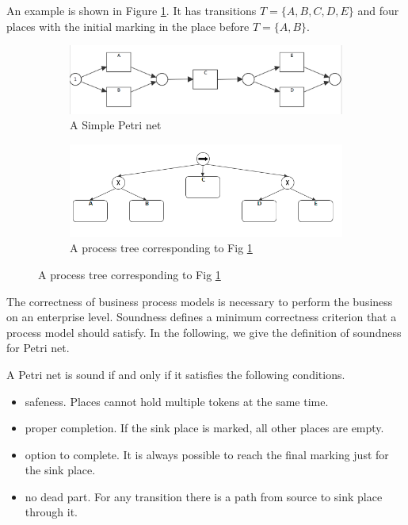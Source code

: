 An example is shown in Figure \ref{fig:pn-seq-2}. It has transitions $T=\{A,B,C,D,E\}$ and four places with the initial marking in the place before $T=\{A,B\}$. 
\begin{figure}[!h]
	\centering
	\begin{subfigure}[b]{0.45\textwidth}
		\centering
		\includegraphics[width=\linewidth]{figures/preliminary/PN06_Seq_2_xor_notnested.png}
		\caption{A Simple Petri net}
		\label{fig:pn-seq-2}
	\end{subfigure}%
	\quad
	\begin{subfigure}[b]{0.45\textwidth}
		\centering
		\includegraphics[width=\linewidth]{figures/preliminary/PT06_Seq_2_xor_notnested.png}
		\caption{A process tree corresponding to Fig \ref{fig:pn-seq-2}}
		\label{fig:pt-seq-2}
	\end{subfigure}%
\end{figure}

The correctness of business process models is necessary to perform the business on an enterprise level. Soundness defines a minimum correctness criterion that a process model should satisfy\cite{van2006structural}. In the following, we give the definition of soundness for Petri net.
\begin{definition}[Soundness]
	A Petri net is sound if and only if it satisfies the following conditions.
	\begin{itemize}
		\itemsep0em 
		\item safeness. Places cannot hold multiple tokens at the same time.
		\item proper completion. If the sink place is marked, all other places are empty.
		\item option to complete. It is always possible to reach the final marking just for the sink place.
		\item no dead part. For any transition there is a path from source to sink place through it. 
	\end{itemize}
\end{definition}

